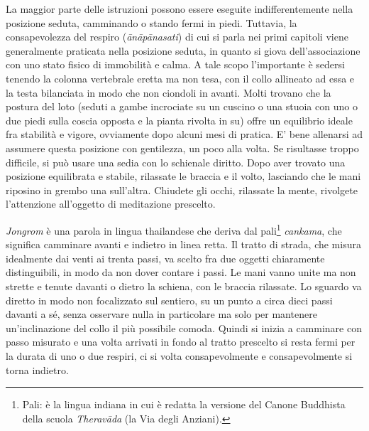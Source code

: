 
La maggior parte delle istruzioni possono essere eseguite
indifferentemente nella posizione seduta, camminando o stando fermi in
piedi. Tuttavia, la consapevolezza del respiro (\textit{ānāpānasati}) di cui si
parla nei primi capitoli viene generalmente praticata nella posizione
seduta, in quanto si giova dell'associazione con uno stato fisico di
immobilità e calma. A tale scopo l'importante è sedersi tenendo la
colonna vertebrale eretta ma non tesa, con il collo allineato ad essa e
la testa bilanciata in modo che non ciondoli in avanti. Molti trovano
che la postura del loto (seduti a gambe incrociate su un cuscino o una
stuoia con uno o due piedi sulla coscia opposta e la pianta rivolta in
su) offre un equilibrio ideale fra stabilità e vigore, ovviamente dopo
alcuni mesi di pratica. E' bene allenarsi ad assumere questa posizione
con gentilezza, un poco alla volta. Se risultasse troppo difficile, si
può usare una sedia con lo schienale diritto. Dopo aver trovato una
posizione equilibrata e stabile, rilassate le braccia e il volto,
lasciando che le mani riposino in grembo una sull'altra. Chiudete gli
occhi, rilassate la mente, rivolgete l'attenzione all'oggetto di
meditazione prescelto.

\label{jongrom}
\textit{Jongrom} è una parola in lingua thailandese che deriva dal
pali\footnote{Pali: è la lingua indiana in cui è redatta la versione
del Canone Buddhista della scuola \textit{Theravāda} (la Via degli Anziani).}
\textit{cankama}, che significa camminare avanti e indietro in
linea retta. Il tratto di strada, che misura idealmente dai venti ai
trenta passi, va scelto fra due oggetti chiaramente distinguibili, in
modo da non dover contare i passi. Le mani vanno unite ma non strette e
tenute davanti o dietro la schiena, con le braccia rilassate. Lo sguardo
va diretto in modo non focalizzato sul sentiero, su un punto a circa
dieci passi davanti a sé, senza osservare nulla in particolare ma solo
per mantenere un'inclinazione del collo il più possibile comoda. Quindi
si inizia a camminare con passo misurato e una volta arrivati in fondo
al tratto prescelto si resta fermi per la durata di uno o due respiri,
ci si volta consapevolmente e consapevolmente si torna indietro.

